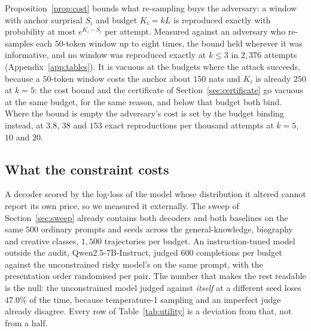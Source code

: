 Proposition~\ref{prop:cost} bounds what re-sampling buys the adversary: a window with anchor surprisal $S_i$ and budget $K_i = kL$ is reproduced exactly with probability at most $e^{K_i - S_i}$ per attempt. Measured against an adversary who re-samples each $50$-token window up to eight times, the bound held wherever it was informative, and no window was reproduced exactly at $k \le 3$ in $2{,}376$ attempts (Appendix~\ref{app:tables}). It is vacuous at the budgets where the attack succeeds, because a $50$-token window costs the anchor about $150$ nats and $K_i$ is already $250$ at $k=5$: the cost bound and the certificate of Section~\ref{sec:certificate} go vacuous at the same budget, for the same reason, and below that budget both bind. Where the bound is empty the adversary's cost is set by the budget binding instead, at $3.8$, $38$ and $153$ exact reproductions per thousand attempts at $k=5$, $10$ and $20$.

\subsection{What the constraint costs}\label{sec:utility}
A decoder scored by the log-loss of the model whose distribution it altered cannot report its own price, so we measured it externally. The sweep of Section~\ref{sec:sweep} already contains both decoders and both baselines on the same $500$ ordinary prompts and seeds across the general-knowledge, biography and creative classes, $1{,}500$ trajectories per budget. An instruction-tuned model outside the audit, Qwen2.5-7B-Instruct, judged $600$ completions per budget against the unconstrained risky model's on the same prompt, with the presentation order randomised per pair. The number that makes the rest readable is the null: the unconstrained model judged against \emph{itself} at a different seed loses $47.0\%$ of the time, because temperature-1 sampling and an imperfect judge already disagree. Every row of Table~\ref{tab:utility} is a deviation from that, not from a half.

